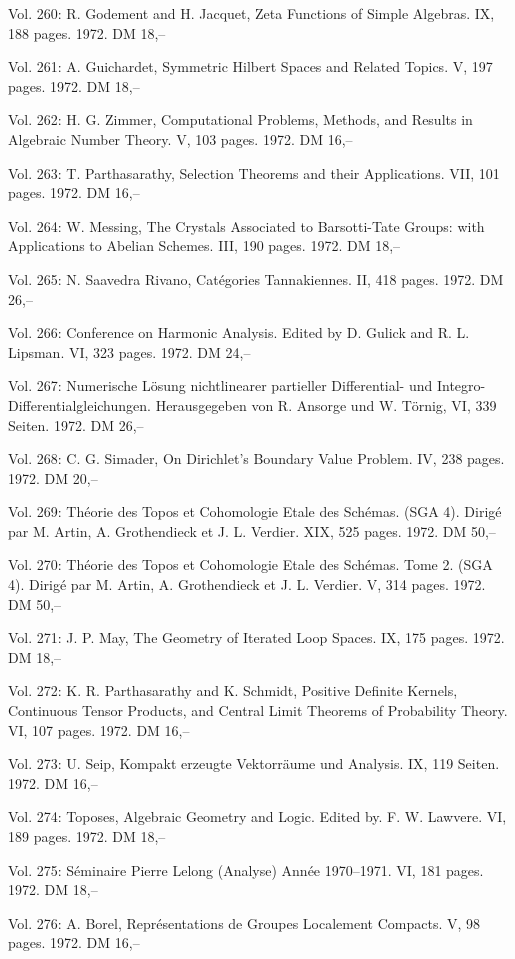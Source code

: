 Vol. 260: R. Godement and H. Jacquet, Zeta Functions of Simple Algebras. IX, 188 pages. 1972. DM 18,--

Vol. 261: A. Guichardet, Symmetric Hilbert Spaces and Related Topics. V, 197 pages. 1972. DM 18,--

Vol. 262: H. G. Zimmer, Computational Problems, Methods, and Results in Algebraic Number Theory. V, 103 pages. 1972. DM 16,--

Vol. 263: T. Parthasarathy, Selection Theorems and their Applications. VII, 101 pages. 1972. DM 16,--

Vol. 264: W. Messing, The Crystals Associated to Barsotti-Tate Groups: with Applications to Abelian Schemes. III, 190 pages. 1972. DM 18,--

Vol. 265: N. Saavedra Rivano, Catégories Tannakiennes. II, 418 pages. 1972. DM 26,--

Vol. 266: Conference on Harmonic Analysis. Edited by D. Gulick and R. L. Lipsman. VI, 323 pages. 1972. DM 24,--

Vol. 267: Numerische Lösung nichtlinearer partieller Differential- und Integro-Differentialgleichungen. Herausgegeben von R. Ansorge und W. Törnig, VI, 339 Seiten. 1972. DM 26,--

Vol. 268: C. G. Simader, On Dirichlet's Boundary Value Problem. IV, 238 pages. 1972. DM 20,--

Vol. 269: Théorie des Topos et Cohomologie Etale des Schémas. (SGA 4). Dirigé par M. Artin, A. Grothendieck et J. L. Verdier. XIX, 525 pages. 1972. DM 50,--

Vol. 270: Théorie des Topos et Cohomologie Etale des Schémas. Tome 2. (SGA 4). Dirigé par M. Artin, A. Grothendieck et J. L. Verdier. V, 314 pages. 1972. DM 50,--

Vol. 271: J. P. May, The Geometry of Iterated Loop Spaces. IX, 175 pages. 1972. DM 18,--

Vol. 272: K. R. Parthasarathy and K. Schmidt, Positive Definite Kernels, Continuous Tensor Products, and Central Limit Theorems of Probability Theory. VI, 107 pages. 1972. DM 16,--

Vol. 273: U. Seip, Kompakt erzeugte Vektorräume und Analysis. IX, 119 Seiten. 1972. DM 16,--

Vol. 274: Toposes, Algebraic Geometry and Logic. Edited by. F. W. Lawvere. VI, 189 pages. 1972. DM 18,--

Vol. 275: Séminaire Pierre Lelong (Analyse) Année 1970--1971. VI, 181 pages. 1972. DM 18,--

Vol. 276: A. Borel, Représentations de Groupes Localement Compacts. V, 98 pages. 1972. DM 16,--

